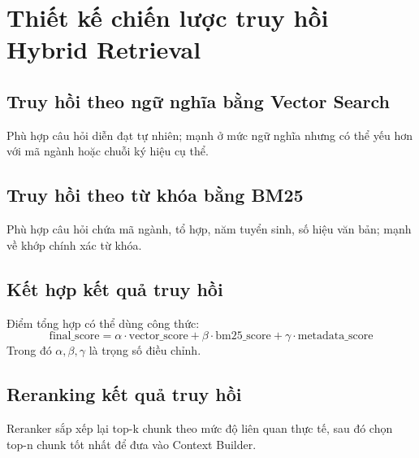﻿\section{Thiết kế chiến lược truy hồi Hybrid Retrieval}

\subsection{Truy hồi theo ngữ nghĩa bằng Vector Search}

Phù hợp câu hỏi diễn đạt tự nhiên; mạnh ở mức ngữ nghĩa nhưng có thể yếu hơn với mã ngành hoặc chuỗi ký hiệu cụ thể.

\subsection{Truy hồi theo từ khóa bằng BM25}

Phù hợp câu hỏi chứa mã ngành, tổ hợp, năm tuyển sinh, số hiệu văn bản; mạnh về khớp chính xác từ khóa.

\subsection{Kết hợp kết quả truy hồi}

Điểm tổng hợp có thể dùng công thức:
\[
\text{final\_score} = \alpha \cdot \text{vector\_score} + \beta \cdot \text{bm25\_score} + \gamma \cdot \text{metadata\_score}
\]
Trong đó \(\alpha, \beta, \gamma\) là trọng số điều chỉnh.

\subsection{Reranking kết quả truy hồi}

Reranker sắp xếp lại top-k chunk theo mức độ liên quan thực tế, sau đó chọn top-n chunk tốt nhất để đưa vào Context Builder.

